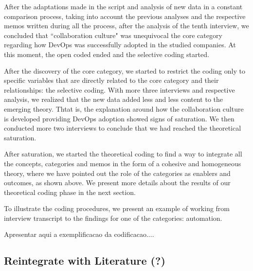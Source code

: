 After the adaptations made in the script and analysis of new data in a constant
comparison process, taking into account the previous analyses and the
respective memos written during all the process, after the analysis of the tenth
interview, we concluded that ``collaboration culture" was unequivocal the core
category regarding how DevOps was successfully adopted in the studied companies.
At this moment, the open coded ended and the selective coding started.

After the discovery of the core category, we started to restrict the coding only
to specific variables that are directly related to the core category and their
relationships: the selective coding.
With more three interviews and respective analysis, we realized that
the new data added less and less content to the emerging theory. Thtat is, the
explanation around how the collaboration culture is developed providing
DevOps adoption showed signs of saturation. We then conducted more two
interviews to conclude that we had reached the theoretical saturation.

After saturation, we started the theoretical coding to find a way to integrate
all the concepts, categories and memos in the form of a cohesive and
homogeneous theory, where we have pointed out the role of the categories as
enablers and outcomes, as shown above. We present more details about 
the results of our theoretical coding phase in the next section. 


To illustrate the coding procedures, we present an example of working from
interview transcript to the findings for one of the categories: automation.


Apresentar aqui a exemplificacao da codificacao....

\subsection{Reintegrate with Literature (?)}
